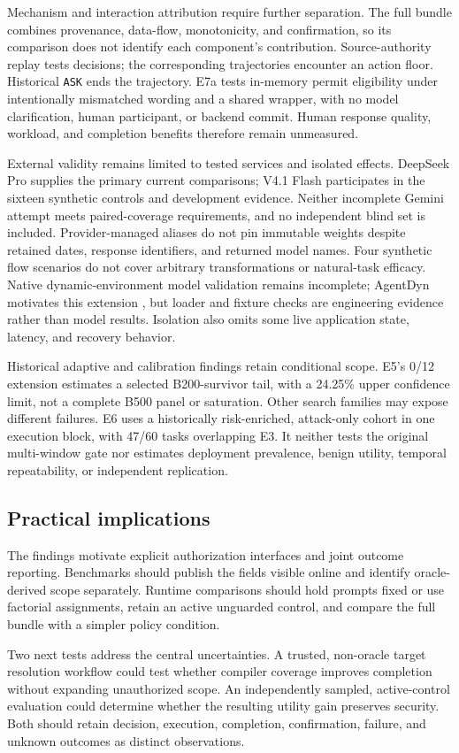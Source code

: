 Mechanism and interaction attribution require further separation. The full bundle combines provenance, data-flow, monotonicity, and confirmation, so its comparison does not identify each component's contribution. Source-authority replay tests decisions; the corresponding trajectories encounter an action floor. Historical \nolinkurl{ASK} ends the trajectory. E7a tests in-memory permit eligibility under intentionally mismatched wording and a shared wrapper, with no model clarification, human participant, or backend commit. Human response quality, workload, and completion benefits therefore remain unmeasured.

External validity remains limited to tested services and isolated effects. DeepSeek Pro supplies the primary current comparisons; V4.1 Flash participates in the sixteen synthetic controls and development evidence. Neither incomplete Gemini attempt meets paired-coverage requirements, and no independent blind set is included. Provider-managed aliases do not pin immutable weights despite retained dates, response identifiers, and returned model names. Four synthetic flow scenarios do not cover arbitrary transformations or natural-task efficacy. Native dynamic-environment model validation remains incomplete; AgentDyn motivates this extension \citep{L38}, but loader and fixture checks are engineering evidence rather than model results. Isolation also omits some live application state, latency, and recovery behavior.

Historical adaptive and calibration findings retain conditional scope. E5's 0/12 extension estimates a selected B200-survivor tail, with a 24.25\% upper confidence limit, not a complete B500 panel or saturation. Other search families may expose different failures. E6 uses a historically risk-enriched, attack-only cohort in one execution block, with 47/60 tasks overlapping E3. It neither tests the original multi-window gate nor estimates deployment prevalence, benign utility, temporal repeatability, or independent replication.

\subsection{Practical implications}

\label{sec:discussion-practical-implications}

The findings motivate explicit authorization interfaces and joint outcome reporting. Benchmarks should publish the fields visible online and identify oracle-derived scope separately. Runtime comparisons should hold prompts fixed or use factorial assignments, retain an active unguarded control, and compare the full bundle with a simpler policy condition.

Two next tests address the central uncertainties. A trusted, non-oracle target resolution workflow could test whether compiler coverage improves completion without expanding un\-au\-thor\-ized scope. An independently sampled, active-control evaluation could determine whether the resulting utility gain preserves security. Both should retain decision, execution, completion, confirmation, failure, and unknown outcomes as distinct observations.
